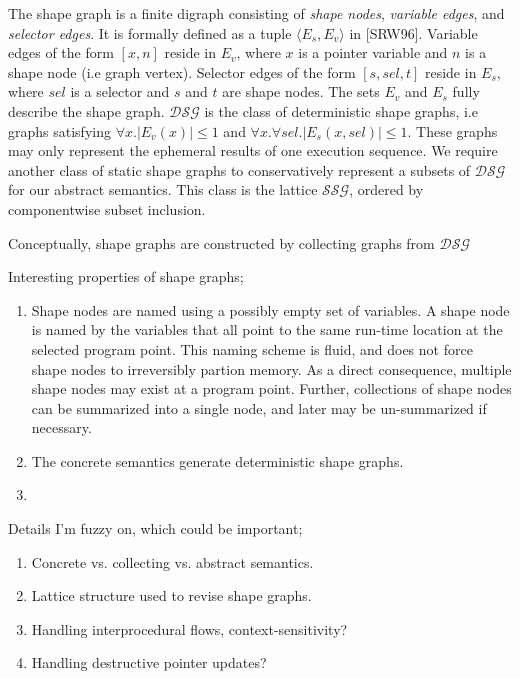 \documentclass{article}
\begin{document}
The shape graph is a finite digraph consisting of \textit{shape nodes},
\textit{variable edges}, and \textit{selector edges}. It is formally defined
as a tuple $\langle E_s, E_v \rangle$ in [SRW96]. Variable edges of the form
$[x, n]$ reside in $E_v$, where $x$ is a pointer variable and $n$ is a shape
node (i.e graph vertex). Selector edges of the form $[s, sel, t]$ reside in
$E_s$, where $sel$ is a selector and $s$ and $t$ are shape nodes. The sets
$E_v$ and $E_s$ fully describe the shape graph. $\mathcal{DSG}$ is the class
of deterministic shape graphs, i.e graphs satisfying $\forall x.  |E_v(x)|
\leq 1$ and $\forall x. \forall sel. |E_s(x, sel)| \leq 1$. These graphs
may only represent the ephemeral results of one execution sequence. We
require another class of static shape graphs to conservatively represent a
subsets of $\mathcal{DSG}$ for our abstract semantics. This class is the
lattice $\mathcal{SSG}$, ordered by componentwise subset inclusion.

Conceptually, shape graphs are constructed by collecting graphs from
$\mathcal{DSG}$ 

Interesting properties of shape graphs;
\begin{enumerate}[1.]
    \item Shape nodes are named using a possibly empty set of variables. A
        shape node is named by the variables that all point to the same
        run-time location at the selected program point. This naming scheme
        is fluid, and does not force shape nodes to irreversibly partion
        memory. As a direct consequence, multiple shape nodes may exist at
        a program point. Further, collections of shape nodes can be
        summarized into a single node, and later may be un-summarized if
        necessary.

    \item The concrete semantics generate deterministic shape graphs.
    \item 
\end{enumerate}

Details I'm fuzzy on, which could be important;
\begin{enumerate}[1.]
    \item Concrete vs. collecting vs. abstract semantics.
    \item Lattice structure used to revise shape graphs.
    \item Handling interprocedural flows, context-sensitivity?
    \item Handling destructive pointer updates?
\end{enumerate}
\end{document}
